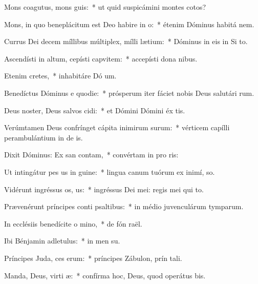 \item Mons coagutus, mons guis:~* ut quid suspicámini montes cotos?
\item Mons, in quo beneplácitum est Deo habire in o:~* étenim Dóminus habitá  nem.
\item Currus Dei decem míllibus múltiplex, mílli lætium:~* Dóminus in eis in Si  to.
\item Ascendísti in altum, cepísti capvitem:~* accepísti dona  nibus.
\item Etenim  cretes,~* inhabitáre Dó um.
\item Benedíctus Dóminus e quodie:~* prósperum iter fáciet nobis Deus salutári rum.
\item Deus noster, Deus salvos cidi:~* et Dómini Dómini éx tis.
\item Verúmtamen Deus confrínget cápita inimirum surum:~* vérticem capílli perambulántium in de is.
\item Dixit Dóminus: Ex san contam,~* convértam in pro ris:
\item Ut intingátur pes us in guine:~* lingua canum tuórum ex inimí,  so.
\item Vidérunt ingréssus os, us:~* ingréssus Dei mei: regis mei qui   to.
\item Prævenérunt príncipes conti psaltibus:~* in médio juvenculárum tymparum.
\item In ecclésiis benedícite o mino,~* de fón raël.
\item Ibi Bénjamin adletulus:~* in men su.
\item Príncipes Juda, ces erum:~* príncipes Zábulon, prín tali.
\item Manda, Deus, virti æ:~* confírma hoc, Deus, quod operátus   bis.
